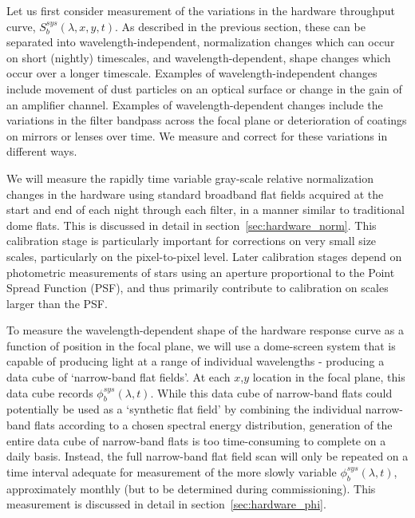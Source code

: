 \documentclass[12pt,preprint]{aastex}
\begin{document}
Let us first consider measurement of the variations in the hardware
throughput curve, $S_b^{sys}(\lambda,x,y,t)$. As described in the
previous section, these can be separated into wavelength-independent,
normalization changes which can occur on short (nightly) timescales,
and wavelength-dependent, shape changes which occur over a longer
timescale. Examples of wavelength-independent changes include movement
of dust particles on an optical surface or change in the gain of an
amplifier channel. Examples of wavelength-dependent changes include
the variations in the filter bandpass across the focal plane or
deterioration of coatings on mirrors or lenses over time. We measure
and correct for these variations in different ways.

We will measure the rapidly time variable gray-scale relative
normalization changes in the hardware using standard broadband flat
fields acquired at the start and end of each night through each
filter, in a manner similar to traditional dome flats. This is
discussed in detail in section~\ref{sec:hardware_norm}.  This
calibration stage is particularly important for corrections on very
small size scales, particularly on the pixel-to-pixel level. Later
calibration stages depend on photometric measurements of stars using
an aperture proportional to the Point Spread Function (PSF), and thus
primarily contribute to calibration on scales larger than the PSF.

To measure the wavelength-dependent shape of the hardware response
curve as a function of position in the focal plane, we will use a
dome-screen system that is capable of producing light at a range of
individual wavelengths - producing a data cube of `narrow-band flat
fields'.  At each $x$,$y$ location in the focal plane, this data cube
records $\phi_b^{sys}(\lambda,t)$. While this data cube of narrow-band
flats could potentially be used as a `synthetic flat field' by
combining the individual narrow-band flats according to a chosen
spectral energy distribution, generation of the entire data cube of
narrow-band flats is too time-consuming to complete on a daily
basis. Instead, the full narrow-band flat field scan will only be
repeated on a time interval adequate for measurement of
the more slowly variable $\phi_b^{sys}(\lambda,t)$, approximately
monthly (but to be determined during commissioning). This measurement
is discussed in detail in section~\ref{sec:hardware_phi}.
\end{document}
